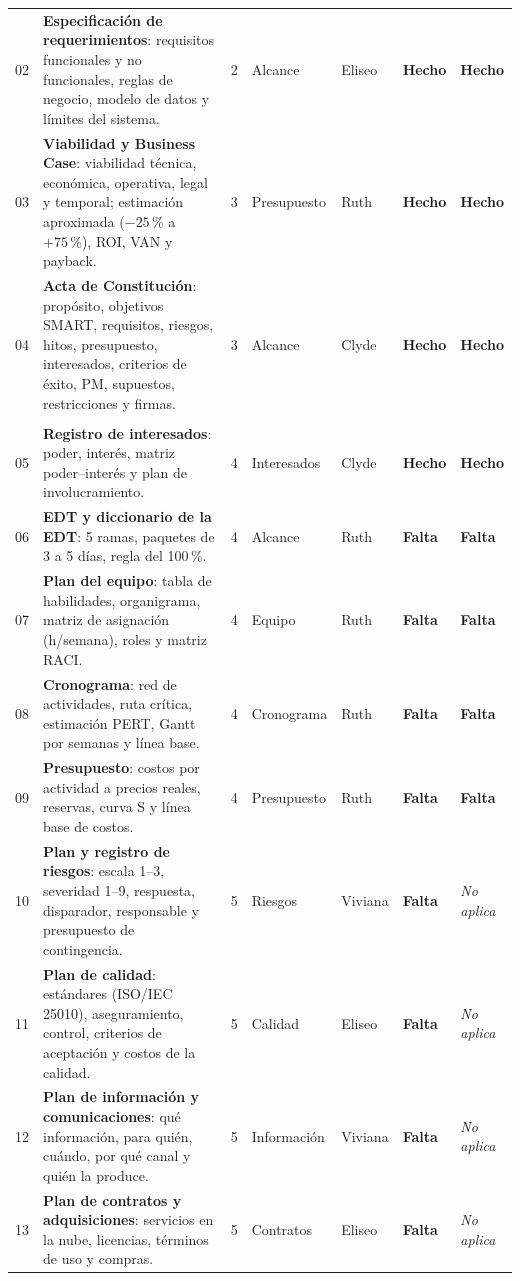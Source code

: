 \documentclass[11pt,a4paper]{article}
\newcommand{\hecho}{\textcolor{VerdeOK}{\textbf{Hecho}}}
\newcommand{\falta}{\textcolor{RojoAlerta}{\textbf{Falta}}}
\newcommand{\noaplica}{\textcolor{GrisOscuro}{\textit{No aplica}}}
\begin{document}
{\begin{longtable}{@{}C{0.7cm} >{\raggedright\arraybackslash}p{6.55cm} C{1.0cm} P{2.25cm} P{1.35cm} C{1.7cm} C{1.7cm}@{}}
02 & \textbf{Especificación de requerimientos}: requisitos funcionales y no funcionales, reglas de negocio, modelo de datos y límites del sistema. & 2 & Alcance & Eliseo & \hecho & \hecho \\
03 & \textbf{Viabilidad y Business Case}: viabilidad técnica, económica, operativa, legal y temporal; estimación aproximada ($-25\,\%$ a $+75\,\%$), ROI, VAN y payback. & 3 & Presupuesto & Ruth & \hecho & \hecho \\
04 & \textbf{Acta de Constitución}: propósito, objetivos SMART, requisitos, riesgos, hitos, presupuesto, interesados, criterios de éxito, PM, supuestos, restricciones y firmas. & 3 & Alcance & Clyde & \hecho & \hecho \\
%
 \\
05 & \textbf{Registro de interesados}: poder, interés, matriz poder--interés y plan de involucramiento. & 4 & Interesados & Clyde & \hecho & \hecho \\
06 & \textbf{EDT y diccionario de la EDT}: 5 ramas, paquetes de 3 a 5 días, regla del 100\,\%. & 4 & Alcance & Ruth & \falta & \falta \\
07 & \textbf{Plan del equipo}: tabla de habilidades, organigrama, matriz de asignación (h/semana), roles y matriz RACI. & 4 & Equipo & Ruth & \falta & \falta \\
08 & \textbf{Cronograma}: red de actividades, ruta crítica, estimación PERT, Gantt por semanas y línea base. & 4 & Cronograma & Ruth & \falta & \falta \\
09 & \textbf{Presupuesto}: costos por actividad a precios reales, reservas, curva S y línea base de costos. & 4 & Presupuesto & Ruth & \falta & \falta \\
10 & \textbf{Plan y registro de riesgos}: escala 1--3, severidad 1--9, respuesta, disparador, responsable y presupuesto de contingencia. & 5 & Riesgos & Viviana & \falta & \noaplica \\
11 & \textbf{Plan de calidad}: estándares (ISO/IEC 25010), aseguramiento, control, criterios de aceptación y costos de la calidad. & 5 & Calidad & Eliseo & \falta & \noaplica \\
12 & \textbf{Plan de información y comunicaciones}: qué información, para quién, cuándo, por qué canal y quién la produce. & 5 & Información & Viviana & \falta & \noaplica \\
13 & \textbf{Plan de contratos y adquisiciones}: servicios en la nube, licencias, términos de uso y compras. & 5 & Contratos & Eliseo & \falta & \noaplica \\

\end{longtable}}
\end{document}

